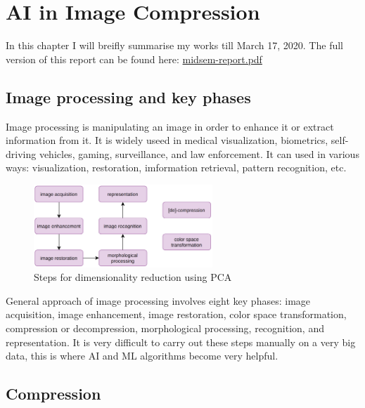 \chapter{AI in Image Compression}
\label{ch:ai-image-compression}

In this chapter I will breifly summarise my works till March 17, 2020. The full version of this report can be found here: 
\href{https://github.com/KishoreKaushal/btp-report-phase2/blob/master/btp_report.pdf}{midsem-report.pdf}

\section{Image processing and key phases}

Image processing is manipulating an image in order to enhance it or extract information from it. 
It is widely useed in medical visualization, biometrics, self-driving vehicles, gaming, surveillance, and law enforcement. It can used in various ways: visualization, restoration, imformation retrieval, pattern recognition, etc.

\vspace{1em}
\begin{figure}[!ht]
    \label{fig:keyPhasesOfImageProcessing}
    \centering
    \includegraphics[width=0.60\textwidth]{../fig/midsemwork/keyPhasesOfImageProcessing.png}
    \caption{Steps for dimensionality reduction using PCA}
\end{figure}

\pagebreak
General approach of image processing involves eight key phases: image acquisition, image enhancement, image restoration, color space transformation, compression or decompression, morphological processing, recognition, and representation. 
It is very difficult to carry out these steps manually on a very big data, this is where AI and ML algorithms become very helpful.



\section{Compression}

